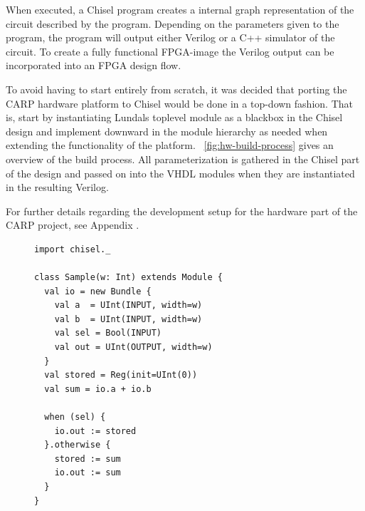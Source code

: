 When executed, a Chisel program creates a internal graph representation of the
circuit described by the program. Depending on the parameters given to the
program, the program will output either Verilog or a C++ simulator of the
circuit. To create a fully functional FPGA-image the Verilog output can be
incorporated into an FPGA design flow.

To avoid having to start entirely from scratch, it was decided that porting the
CARP hardware platform to Chisel would be done in a top-down fashion. That is,
start by instantiating Lundals toplevel module as a blackbox in the Chisel
design and implement downward in the module hierarchy as needed when extending
the functionality of the platform. \figurename~\ref{fig:hw-build-process} gives
an overview of the build process. All parameterization is gathered in the Chisel
part of the design and passed on into the VHDL modules when they are
instantiated in the resulting Verilog.

For further details regarding the development setup for the hardware part of the
CARP project, see Appendix .

\begin{figure}
\begin{mintedsubfloat}{0.5\linewidth}
\begin{verbatim}
import chisel._

class Sample(w: Int) extends Module {
  val io = new Bundle {
    val a  = UInt(INPUT, width=w)
    val b  = UInt(INPUT, width=w)
    val sel = Bool(INPUT)
    val out = UInt(OUTPUT, width=w)
  }
  val stored = Reg(init=UInt(0))
  val sum = io.a + io.b

  when (sel) {
    io.out := stored
  }.otherwise {
    stored := sum
    io.out := sum
  }
} 
\end{verbatim} 
\end{mintedsubfloat}
\end{figure}

